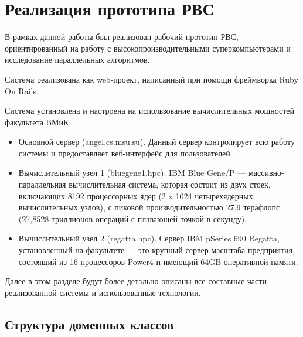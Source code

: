 \section{Реализация прототипа РВС}   
\label{practical}

В рамках данной работы был реализован рабочий прототип РВС, ориентированный на работу с высокопроизводительными суперкомпьютерами и исследование параллельных алгоритмов.

Система реализована как web-проект, написанный при помощи фреймворка Ruby On Rails.   
                                    
Система установлена и настроена на использование вычислительных мощностей факультета ВМиК:
\begin{itemize}
  \item Основной сервер (angel.cs.msu.su). Данный сервер контролирует всю работу системы и предоставляет веб-интерфейс для пользователей.
  \item Вычислительный узел 1 (bluegene1.hpc). IBM Blue Gene/P — массивно-параллельная вычислительная система, которая состоит из двух стоек, включающих 8192 процессорных ядер (2 x 1024 четырехядерных вычислительных узлов), с пиковой производительностью 27,9 терафлопс (27,8528 триллионов операций с плавающей точкой в секунду).   
  \item Вычислительный узел 2 (regatta.hpc). Сервер IBM pSeries 690 Regatta, установленный на факультете --- это крупный сервер масштаба предприятия, состоящий из 16 процессоров Power4 и имеющий 64GB оперативной памяти.
\end{itemize}                                                                                           

Далее в этом разделе будут более детально описаны все составные части реализованной системы и использованные технологии.

\subsection{Структура доменных классов}

